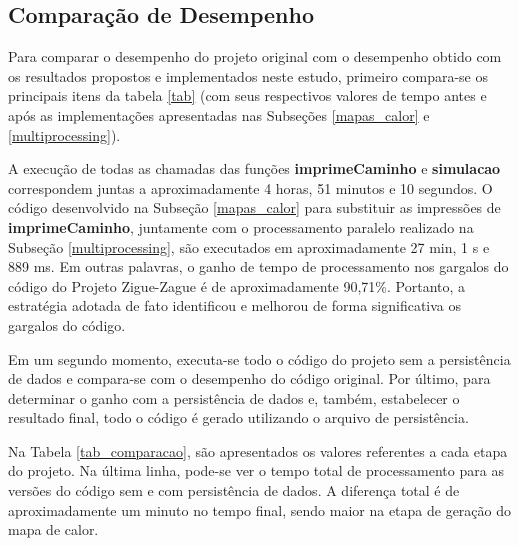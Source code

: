 \documentclass[12pt]{article}
\begin{document}
\subsection{Comparação de Desempenho}
\label{comparacao}


Para comparar o desempenho do projeto original com o desempenho obtido com os resultados propostos e implementados neste estudo, primeiro compara-se os principais itens da tabela \ref{tab} (com seus respectivos valores de tempo antes e após as implementações apresentadas nas Subseções \ref{mapas_calor} e \ref{multiprocessing}). 

A execução de todas as chamadas das funções \textbf{imprimeCaminho} e \textbf{simulacao} correspondem juntas a aproximadamente 4 horas, 51 minutos e 10 segundos. O código desenvolvido na Subseção \ref{mapas_calor} para substituir as impressões de \textbf{imprimeCaminho}, juntamente com o processamento paralelo realizado na Subseção \ref{multiprocessing}, são executados em aproximadamente 27 min, 1 s e 889 ms. Em outras palavras, o ganho de tempo de processamento nos gargalos do código do Projeto Zigue-Zague é de aproximadamente 90,71\%. Portanto, a estratégia adotada de fato identificou e melhorou de forma significativa os gargalos do código.

Em um segundo momento, executa-se todo o código do projeto sem a persistência de dados e compara-se com o desempenho do código original. Por último, para determinar o ganho com a persistência de dados e, também, estabelecer o resultado final, todo o código é gerado utilizando o arquivo de persistência.

Na Tabela \ref{tab_comparacao}, são apresentados os valores referentes a cada etapa do projeto. Na última linha, pode-se ver o tempo total de processamento para as versões do código sem e com persistência de dados. A diferença total é de aproximadamente um minuto no tempo final, sendo maior na etapa de geração do mapa de calor.
\end{document}
